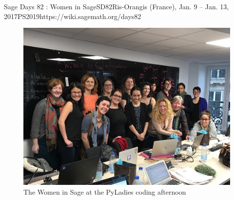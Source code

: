 \begin{event}{Sage Days 82 : Women in Sage}{SD82}{Ris-Orangis (France), Jan. 9 -- Jan. 13, 2017}{PS}{20}{19}{https://wiki.sagemath.org/days82}
\begin{figure}[ht]
\includegraphics[scale=.2]{pyladies-WIS.jpg}
\caption*{The Women in Sage at the PyLadies coding afternoon}
\end{figure}



\end{event}